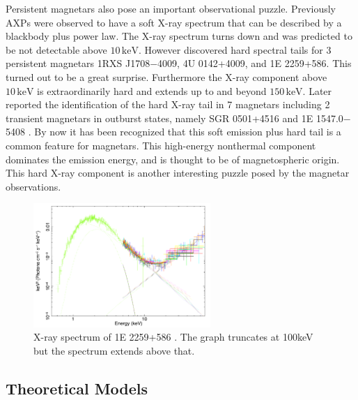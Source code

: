 Persistent magnetars also pose an important observational puzzle. Previously
AXPs were observed to have a soft X-ray spectrum that can be described by a
blackbody plus power law. The X-ray spectrum turns down and was predicted to be
not detectable above $10\,\mathrm{keV}$. However \citet{kuiper_discovery_2006}
discovered hard spectral tails for 3 persistent magnetars 1RXS J1708$-$4009, 4U
0142+4009, and 1E 2259+586. This turned out to be a great surprise. Furthermore
the X-ray component above $10\,\mathrm{keV}$ is extraordinarily hard and extends
up to and beyond $150\,\mathrm{keV}$. Later \citet{enoto_broadband_2010}
reported the identification of the hard X-ray tail in 7 magnetars including 2
transient magnetars in outburst states, namely SGR 0501+4516
\citep{enoto_wide-band_2010} and 1E 1547.0$-$5408 \citep{enoto_suzaku_2010}. By
now it has been recognized that this soft emission plus hard tail is a common
feature for magnetars. This high-energy nonthermal component dominates the
emission energy, and is thought to be of magnetospheric origin. This hard X-ray
component is another interesting puzzle posed by the magnetar observations.

\begin{figure}[h]
  \centering
  \includegraphics[width=0.6\textwidth]{pics/intro/hard-x-ray.png}
  \caption[X-ray spectrum of 1E 2259+586.]{X-ray spectrum of 1E 2259+586
    \citep{vogel_nustar_2014}. The graph truncates at 100keV but the spectrum
    extends above that.}
  \label{fig:magnetar-hard-x-ray}
\end{figure}


\subsection{Theoretical Models}
\label{sec:intro-magnetar-theory}

